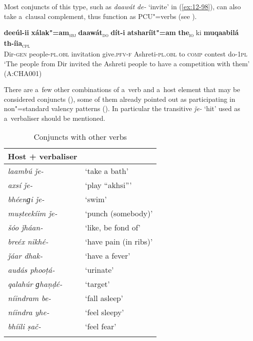Most conjuncts of this type, such as \textit{daawát de-} `invite' in (\ref{ex:12-98}), can also take a~clausal complement, thus function as PCU"=verbs (see ).

\begin{exe}
\ex
\label{ex:12-98}
\gll {\ob}\textbf{deeúl-ii} \textbf{xálak"=am}{\cb}\textsubscript{\textsc{\upshape sbj}} {\ob}\textbf{daawát}{\cb}\textsubscript{\textsc{\upshape do}} {\ob}\textbf{dít-i}{\cb} {\ob}\textbf{atsharíit"=am} \textbf{the}{\cb}\textsubscript{\textsc{\upshape io}} ki {\ob}\textbf{muqaabilá} \textbf{th-íia}{\cb}\textsubscript{\textsc{\upshape cpl}}\\
Dir-\textsc{gen} people-\textsc{pl.obl} invitation give.\textsc{pfv-f}  Ashreti-\textsc{pl.obl} to \textsc{comp} contest do-\textsc{1pl}\\
\glt `The people from Dir invited the Ashreti people to have a competition with them' (A:CHA001)
\end{exe}

 There are a~few other combinations of a~verb and a~host element that may be considered conjuncts (), some of them already pointed out as participating in non"=standard valency patterns (). In particular the transitive \textit{ǰe-} `hit' used as a~verbaliser should be mentioned.


\begin{table}[ht]
\caption{Conjuncts with other verbs}
\begin{tabularx}{.75\textwidth}{ l@{\hspace{45pt}} Q }
\lspbottomrule
\textbf{Host + verbaliser} &
\\\hline
\textit{laambú ǰe-} &
`take a bath'\\
\textit{axsí ǰe-} &
`play ``akhsi'''\\
\textit{bhéenɡi ǰe-} &
`swim'\\
\textit{muṣteekíim ǰe-} &
`punch (somebody)'\\
\textit{šóo ǰháan-} &
`like, be fond of'\\
\textit{breéx nikhé-} &
`have pain (in ribs)'\\
\textit{ǰáar dhak-} &
`have a fever'\\
\textit{audás phooṭá-} &
`urinate'\\
\textit{qalahúr ɡhaṇḍé-} &
`target'\\
\textit{níindram be-} &
`fall asleep'\\
\textit{níindra yhe-} &
`feel sleepy'\\
\textit{bhíili ṣač-} &
`feel fear'\\\lspbottomrule
\end{tabularx}
\label{tab:12-9}
\end{table}


